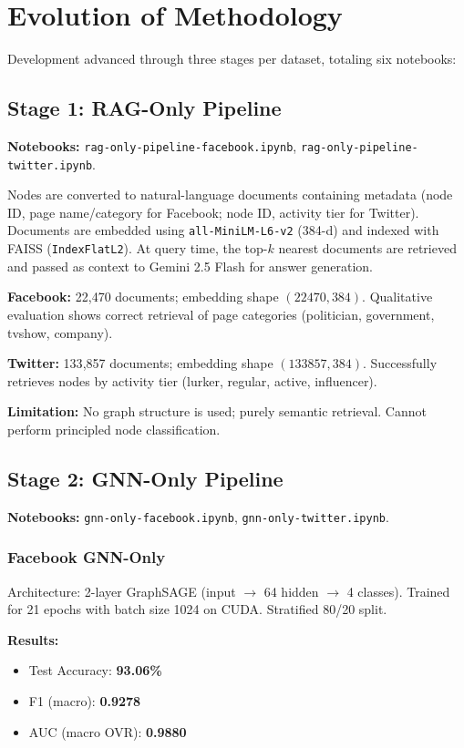 \documentclass[conference]{IEEEtran}
\begin{document}
\section{Evolution of Methodology}

Development advanced through three stages per dataset, totaling six notebooks:

\subsection{Stage 1: RAG-Only Pipeline}
\textbf{Notebooks:} \texttt{rag-only-pipeline-facebook.ipynb}, \texttt{rag-only-pipeline-twitter.ipynb}.

Nodes are converted to natural-language documents containing metadata (node ID, page name/category for Facebook; node ID, activity tier for Twitter). Documents are embedded using \texttt{all-MiniLM-L6-v2} (384-d) and indexed with FAISS (\texttt{IndexFlatL2}). At query time, the top-$k$ nearest documents are retrieved and passed as context to Gemini 2.5 Flash for answer generation.

\textbf{Facebook:} 22{,}470 documents; embedding shape $(22470, 384)$. Qualitative evaluation shows correct retrieval of page categories (politician, government, tvshow, company).

\textbf{Twitter:} 133{,}857 documents; embedding shape $(133857, 384)$. Successfully retrieves nodes by activity tier (lurker, regular, active, influencer).

\textbf{Limitation:} No graph structure is used; purely semantic retrieval. Cannot perform principled node classification.

\subsection{Stage 2: GNN-Only Pipeline}
\textbf{Notebooks:} \texttt{gnn-only-facebook.ipynb}, \texttt{gnn-only-twitter.ipynb}.

\subsubsection{Facebook GNN-Only}
Architecture: 2-layer GraphSAGE (input $\rightarrow$ 64 hidden $\rightarrow$ 4 classes). Trained for 21 epochs with batch size 1024 on CUDA. Stratified 80/20 split.

\textbf{Results:}
\begin{itemize}
  \item Test Accuracy: \textbf{93.06\%}
  \item F1 (macro): \textbf{0.9278}
  \item AUC (macro OVR): \textbf{0.9880}
\end{itemize}
\end{document}
